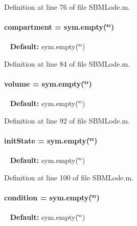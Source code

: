 Definition at line 76 of file S\+B\+M\+Lode.\+m.

\hypertarget{class_s_b_m_lode_a70729d905c114f8f08b3507f20806dd2}{}
\paragraph[{compartment}]{\setlength{\rightskip}{0pt plus 5cm}compartment = sym.\+empty(\char`\"{}\char`\"{})}\label{class_s_b_m_lode_a70729d905c114f8f08b3507f20806dd2}
~\newline
{\bfseries Default\+:} sym.\+empty(\char`\"{}\char`\"{}) 

Definition at line 84 of file S\+B\+M\+Lode.\+m.

\hypertarget{class_s_b_m_lode_a9bc498ccac8db41438f855f5dd3f4c05}{}
\paragraph[{volume}]{\setlength{\rightskip}{0pt plus 5cm}volume = sym.\+empty(\char`\"{}\char`\"{})}\label{class_s_b_m_lode_a9bc498ccac8db41438f855f5dd3f4c05}
~\newline
{\bfseries Default\+:} sym.\+empty(\char`\"{}\char`\"{}) 

Definition at line 92 of file S\+B\+M\+Lode.\+m.

\hypertarget{class_s_b_m_lode_a67d068407e71cba6ca16f3f6b6d1794c}{}
\paragraph[{init\+State}]{\setlength{\rightskip}{0pt plus 5cm}init\+State = sym.\+empty(\char`\"{}\char`\"{})}\label{class_s_b_m_lode_a67d068407e71cba6ca16f3f6b6d1794c}
~\newline
{\bfseries Default\+:} sym.\+empty(\char`\"{}\char`\"{}) 

Definition at line 100 of file S\+B\+M\+Lode.\+m.

\hypertarget{class_s_b_m_lode_a4824b91cc0e6b5f112bdd8049af4d7d6}{}
\paragraph[{condition}]{\setlength{\rightskip}{0pt plus 5cm}condition = sym.\+empty(\char`\"{}\char`\"{})}\label{class_s_b_m_lode_a4824b91cc0e6b5f112bdd8049af4d7d6}
~\newline
{\bfseries Default\+:} sym.\+empty(\char`\"{}\char`\"{}) 

